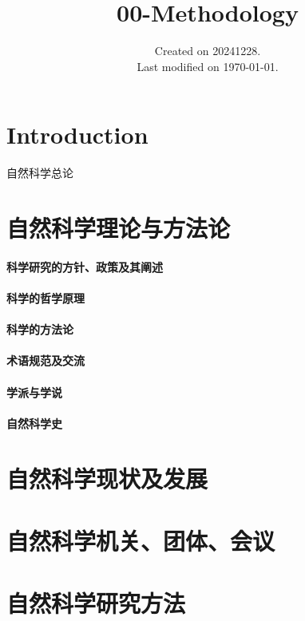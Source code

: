 \documentclass[UTF8]{NatureUniverse}
\begin{document}
\title{00-Methodology}
\date{Created on 20241228.\\   Last modified on \today.}
\maketitle
\tableofcontents


\chapter{Introduction}
自然科学总论


\chapter{自然科学理论与方法论}
    \subsubsection{科学研究的方针、政策及其阐述}
    \subsubsection{科学的哲学原理}
    \subsubsection{科学的方法论}
    \subsubsection{术语规范及交流}
    \subsubsection{学派与学说}
    \subsubsection{自然科学史}


\chapter{自然科学现状及发展}

\chapter{自然科学机关、团体、会议}

\chapter{自然科学研究方法}
\end{document}
